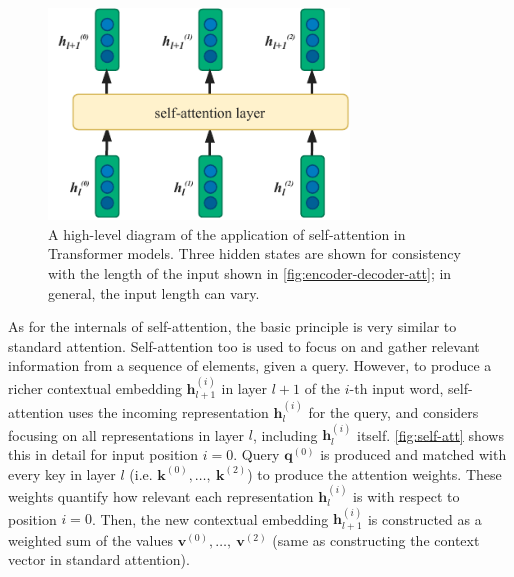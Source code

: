 \documentclass[bsc,frontabs,twoside,singlespacing,parskip,deptreport]{infthesis}
\begin{document}
{{{      \begin{figure}[h!t]
        \centering
        \includegraphics[width=8cm]{graphics/self-att-layer}
        \cprotect\caption{A high-level diagram of the application of self-attention in Transformer models. Three hidden states are shown for consistency with the length of the input shown in \autoref{fig:encoder-decoder-att}; in general, the input length can vary.}
        \label{fig:self-att-layer}
      \end{figure}

      As for the internals of self-attention, the basic principle is very similar to standard attention. Self-attention too is used to focus on and gather relevant information from a sequence of elements, given a query. However, to produce a richer contextual embedding $\bm{h}_{l+1}^{(i)}$ in layer $l+1$ of the $i$-th input word, self-attention uses the incoming representation $\bm{h}_l^{(i)}$ for the query, and considers focusing on all representations in layer $l$, including $\bm{h}_l^{(i)}$ itself. \autoref{fig:self-att} shows this in detail for input position $i=0$. Query $\bm{q}^{(0)}$ is produced and matched with every key in layer $l$ (i.e. $\bm{k}^{(0)},\ldots,\ \bm{k}^{(2)}$) to produce the attention weights. These weights quantify how relevant each representation $\bm{h}_l^{(i)}$ is with respect to position $i=0$. Then, the new contextual embedding $\bm{h}_{l+1}^{(i)}$ is constructed as a weighted sum of the values $\bm{v}^{(0)},\ldots,\ \bm{v}^{(2)}$ (same as constructing the context vector in standard attention).

}}}
\end{document}
